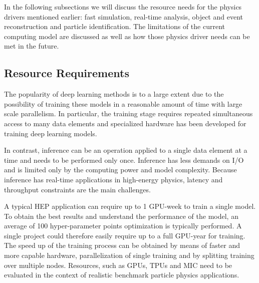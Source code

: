 In the following subsections we will discuss the resource needs for the physics drivers mentioned earlier: fast simulation, real-time analysis, object and event reconstruction and particle identification. The limitations of the current computing model are discussed as well as how those physics driver needs can be met in the future.



\subsection{Resource Requirements}

The popularity of deep learning methods is to a large extent due to the possibility of training these models in a reasonable amount of time with large scale parallelism. In particular, the training stage requires repeated simultaneous access to many data elements and specialized hardware has been developed for training deep learning models. %

In contrast, inference can be an operation applied to a single data element at a time and needs to be performed only once. Inference has less demands on I/O and is limited only by the computing power and model complexity. Because inference has real-time applications in high-energy physics, latency and throughput constraints are the main challenges.

A typical HEP application can require up to 1 GPU-week to train a single model.
To obtain the best results and understand the performance of the model, an average of 100 hyper-parameter points optimization is typically performed. A single project could therefore easily require up to a full GPU-year for training.
The speed up of the training process can be obtained by means of faster and more capable hardware, parallelization of single training and by splitting training over multiple nodes. Resources, such as GPUs, TPUs and MIC need to be evaluated in the context of realistic benchmark particle physics applications.

